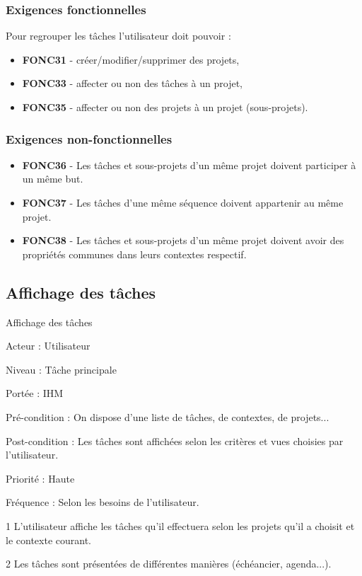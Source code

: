 	\subsubsection{Exigences fonctionnelles}
		Pour regrouper les tâches l'utilisateur doit pouvoir :
		\begin{itemize}	\renewcommand{\labelitemi}{}
			\item \textbf{FONC31} - créer/modifier/supprimer des projets,
			\item \textbf{FONC33} - affecter ou non des tâches à un projet,
			\item \textbf{FONC35} - affecter ou non des projets à un projet (sous-projets).
		\end{itemize}
		
	\subsubsection{Exigences non-fonctionnelles}
		\begin{itemize}	\renewcommand{\labelitemi}{}
			\item \textbf{FONC36} - Les tâches et sous-projets d'un même projet doivent participer à un même but.
			\item \textbf{FONC37} - Les tâches d'une même séquence doivent appartenir au même projet.
			\item \textbf{FONC38} - Les tâches et sous-projets d'un même projet doivent avoir des propriétés communes dans leurs contextes respectif.			
		\end{itemize}
		

\subsection{Affichage des tâches}
	\begin{usecase}{Affichage des tâches} 
		\begin{information}
			\item[Acteur :] Utilisateur
			\item[Niveau :] Tâche principale
			\item[Portée :] IHM
			\item[Pré-condition :] On dispose d'une liste de tâches, de contextes, de projets...
			\item[Post-condition :] Les tâches sont affichées selon les critères et vues choisies par l'utilisateur.
			\item[Priorité :] Haute
			\item[Fréquence :] Selon les besoins de l'utilisateur.
		\end{information}
		\begin{scenario}
			\item[1] L'utilisateur affiche les tâches qu'il effectuera selon les projets qu'il a choisit et le contexte courant.
			\item[2] Les tâches sont présentées de différentes manières (échéancier, agenda...).
		\end{scenario}
	\end{usecase}
	
